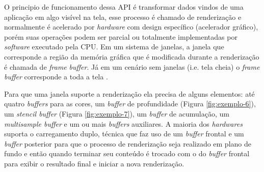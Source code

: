 O principio de funcionamento dessa API é transformar dados vindos de uma aplicação em algo visível na tela, esse processo é chamado de renderização e normalmente é acelerado por \textit{hardware} com design específico (acelerador gráfico), porém suas operações podem ser parcial ou totalmente implementadas por \textit{software} executado pela CPU. Em um sistema de janelas, a janela que corresponde a região da memória gráfica que é modificada durante a renderização é chamada de \textit{frame} \textit{buffer}. Já em um cenário sem janelas (i.e. tela cheia) o \textit{frame} \textit{buffer} corresponde a toda a tela \cite{GLSLBook}.

Para que uma janela suporte a renderização ela precisa de alguns elementos: até quatro \textit{buffers} para as cores, um \textit{buffer} de profundidade (Figura \ref{fig:exemplo-6}), um \textit{stencil buffer} (Figura \ref{fig:exemplo-7}), um \textit{buffer} de acumulação, um \textit{multisample buffer} e um ou mais \textit{buffers} auxiliares. A maioria dos \textit{hardwares} suporta o carregamento duplo, técnica que faz uso de um \textit{buffer} frontal e um \textit{buffer} posterior para que o processo de renderização seja realizado em plano de fundo e então quando terminar seu conteúdo é trocado com o do \textit{buffer} frontal para exibir o resultado final e iniciar a nova renderização. 

\phantom{a}

\phantom{a}

\begin{figure}[h!]
	\centering
\end{figure}
\nocite{dptbuf}

